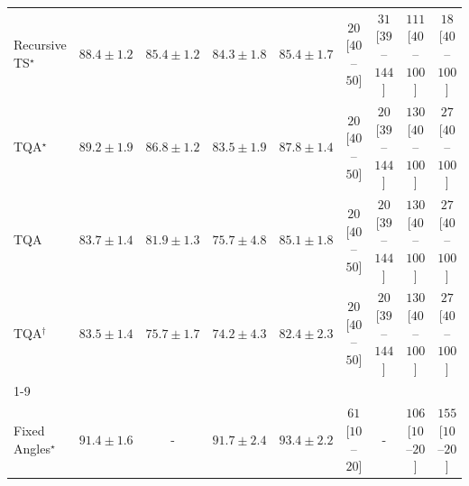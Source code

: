 \begin{tabular}{l|cccc|cccc|}
Recursive TS$^\star$ & {\cellcolor[HTML]{006636}} \color[HTML]{F1F1F1} $88.4\pm 1.2$ & {\cellcolor[HTML]{12763D}} \color[HTML]{F1F1F1} $85.4\pm 1.2$ & {\cellcolor[HTML]{187B3F}} \color[HTML]{F1F1F1} $84.3\pm 1.8$ & {\cellcolor[HTML]{12763D}} \color[HTML]{F1F1F1} $85.4\pm 1.7$ & {\cellcolor[HTML]{FFF4F0}} \color[HTML]{000000} $20$ [$40$--$50$] & {\cellcolor[HTML]{FFF2EE}} \color[HTML]{000000} $31$ [$39$--$144$] & {\cellcolor[HTML]{FDE0DD}} \color[HTML]{000000} $111$ [$40$--$100$] & {\cellcolor[HTML]{FFF5F1}} \color[HTML]{000000} $18$ [$40$--$100$] \\
TQA$^\star$ & {\cellcolor[HTML]{006034}} \color[HTML]{F1F1F1} $89.2\pm 1.9$ & {\cellcolor[HTML]{086E3A}} \color[HTML]{F1F1F1} $86.8\pm 1.2$ & {\cellcolor[HTML]{1E8041}} \color[HTML]{F1F1F1} $83.5\pm 1.9$ & {\cellcolor[HTML]{016937}} \color[HTML]{F1F1F1} $87.8\pm 1.4$ & {\cellcolor[HTML]{FFF4F0}} \color[HTML]{000000} $20$ [$40$--$50$] & {\cellcolor[HTML]{FFF4F0}} \color[HTML]{000000} $20$ [$39$--$144$] & {\cellcolor[HTML]{FDDBD7}} \color[HTML]{000000} $130$ [$40$--$100$] & {\cellcolor[HTML]{FFF3EF}} \color[HTML]{000000} $27$ [$40$--$100$] \\
TQA & {\cellcolor[HTML]{1D7F41}} \color[HTML]{F1F1F1} $83.7\pm 1.4$ & {\cellcolor[HTML]{288A47}} \color[HTML]{F1F1F1} $81.9\pm 1.3$ & {\cellcolor[HTML]{53B466}} \color[HTML]{F1F1F1} $75.7\pm 4.8$ & {\cellcolor[HTML]{14783E}} \color[HTML]{F1F1F1} $85.1\pm 1.8$ & {\cellcolor[HTML]{FFF4F0}} \color[HTML]{000000} $20$ [$40$--$50$] & {\cellcolor[HTML]{FFF4F0}} \color[HTML]{000000} $20$ [$39$--$144$] & {\cellcolor[HTML]{FDDBD7}} \color[HTML]{000000} $130$ [$40$--$100$] & {\cellcolor[HTML]{FFF3EF}} \color[HTML]{000000} $27$ [$40$--$100$] \\
TQA$^\dagger$ & {\cellcolor[HTML]{1E8041}} \color[HTML]{F1F1F1} $83.5\pm 1.4$ & {\cellcolor[HTML]{53B466}} \color[HTML]{F1F1F1} $75.7\pm 1.7$ & {\cellcolor[HTML]{62BB6E}} \color[HTML]{F1F1F1} $74.2\pm 4.3$ & {\cellcolor[HTML]{258745}} \color[HTML]{F1F1F1} $82.4\pm 2.3$ & {\cellcolor[HTML]{FFF4F0}} \color[HTML]{000000} $20$ [$40$--$50$] & {\cellcolor[HTML]{FFF4F0}} \color[HTML]{000000} $20$ [$39$--$144$] & {\cellcolor[HTML]{FDDBD7}} \color[HTML]{000000} $130$ [$40$--$100$] & {\cellcolor[HTML]{FFF3EF}} \color[HTML]{000000} $27$ [$40$--$100$] \\
\cline{1-9}
\multicolumn{9}{c}{\rule{0pt}{8pt}SV} \\
\midrule
Fixed Angles$^\star$ & {\cellcolor[HTML]{03456C}} \color[HTML]{F1F1F1} $91.4\pm 1.6$ & {\cellcolor[HTML]{000000}} \color[HTML]{F1F1F1} {\cellcolor{white}} \color{black} - & {\cellcolor[HTML]{034369}} \color[HTML]{F1F1F1} $91.7\pm 2.4$ & {\cellcolor[HTML]{023858}} \color[HTML]{F1F1F1} $93.4\pm 2.2$ & {\cellcolor[HTML]{FEEBE8}} \color[HTML]{000000} $61$ [$10$--$20$] & {\cellcolor[HTML]{000000}} \color[HTML]{F1F1F1} {\cellcolor{white}} \color{black} - & {\cellcolor[HTML]{FDE1DE}} \color[HTML]{000000} $106$ [$10$--$20$] & {\cellcolor[HTML]{FDD4D0}} \color[HTML]{000000} $155$ [$10$--$20$] \\

\end{tabular}
